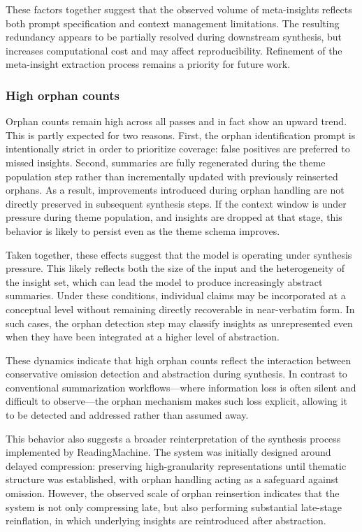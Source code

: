 \documentclass[
  11pt,
]{article}
\begin{document}
These factors together suggest that the observed volume of meta-insights
reflects both prompt specification and context management limitations.
The resulting redundancy appears to be partially resolved during
downstream synthesis, but increases computational cost and may affect
reproducibility. Refinement of the meta-insight extraction process
remains a priority for future work.

\subsubsection{High orphan counts}\label{high-orphan-counts}

Orphan counts remain high across all passes and in fact show an upward trend. 
This is partly expected for two reasons. First, the orphan identification prompt 
is intentionally strict in order to prioritize coverage: false positives are preferred 
to missed insights. Second, summaries are fully regenerated during the theme population 
step rather than incrementally updated with previously reinserted orphans. As a result, 
improvements introduced during orphan handling are not directly preserved in subsequent 
synthesis steps. If the context window is under pressure during theme population, and 
insights are dropped at that stage, this behavior is likely to persist even as the theme 
schema improves.


Taken together, these effects suggest that the model is operating under
synthesis pressure. This likely reflects both the size of the input and
the heterogeneity of the insight set, which can lead the model to
produce increasingly abstract summaries. Under these conditions,
individual claims may be incorporated at a conceptual level without
remaining directly recoverable in near-verbatim form. In such cases, the
orphan detection step may classify insights as unrepresented even when
they have been integrated at a higher level of abstraction.

These dynamics indicate that high orphan counts reflect the interaction
between conservative omission detection and abstraction during
synthesis. In contrast to conventional summarization workflows---where
information loss is often silent and difficult to observe---the orphan
mechanism makes such loss explicit, allowing it to be detected and
addressed rather than assumed away.

This behavior also suggests a broader reinterpretation of the synthesis
process implemented by ReadingMachine. The system was initially designed
around delayed compression: preserving high-granularity representations
until thematic structure was established, with orphan handling acting as
a safeguard against omission. However, the observed scale of orphan
reinsertion indicates that the system is not only compressing late, but
also performing substantial late-stage reinflation, in which underlying
insights are reintroduced after abstraction.
\end{document}
